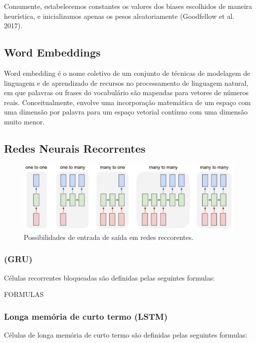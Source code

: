 \documentclass[12pt]{article}
\begin{document}
Comumente, estabelecemos constantes os valores dos biases escolhidos de maneira heurística, e inicializamos apenas os pesos aleatoriamente (Goodfellow et al. 2017).

\subsection{Word Embeddings}

Word embedding é o nome coletivo de um conjunto de técnicas de modelagem de linguagem e de aprendizado de recursos no processamento de linguagem natural, em que palavras ou frases do vocabulário são mapeadas para vetores de números reais. Conceitualmente, envolve uma incorporação matemática de um espaço com uma dimensão por palavra para um espaço vetorial contínuo com uma dimensão muito menor.

\subsection{Redes Neurais Recorrentes}

\begin{figure}[ht]
\centering
\includegraphics[width=1\textwidth]{images/rnn-effectiveness-examples.jpeg}
\caption{
    Possibilidades de entrada de saída em redes reccorentes. \cite{karpathy:2015}
}
\label{fig:sigmoid}
\end{figure}

\subsubsection{(GRU)}
Células recorrentes bloqueadas são definidas pelas seguintes formulas:

FORMULAS

\subsubsection{Longa memória de curto termo (LSTM)}

Células de longa memória de curto termo são definidas pelas seguintes formulas:
\end{document}
